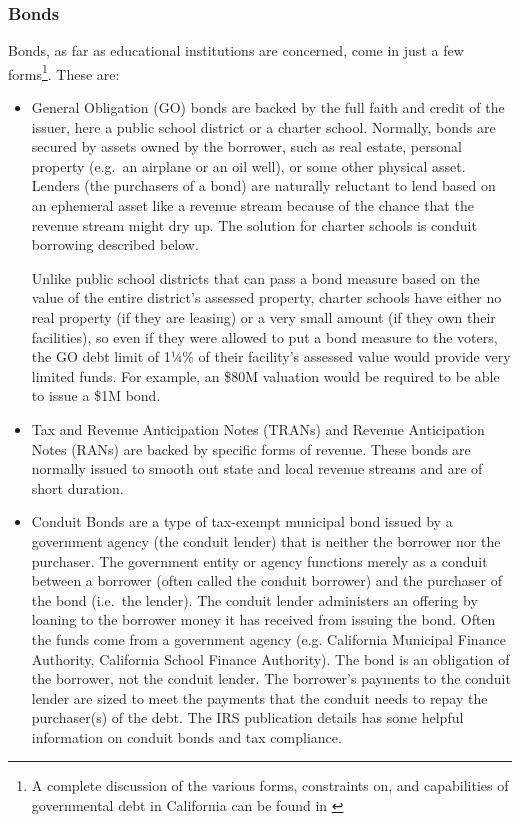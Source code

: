 \subsubsection{Bonds}%
\label{sec:bonds}\indent%

Bonds, as far as educational institutions are concerned, come in just a few forms\footnote{A complete discussion of the various forms, constraints on, and capabilities of governmental debt in California can be found in  \parencite{CDIAC2023}}. These are:

\begin{itemize}
  \item General Obligation (GO) bonds are backed by the full faith and credit of the issuer, here a public school district or a charter school. Normally, bonds are secured by assets owned by the borrower, such as real estate, personal property (e.g.\ an airplane or an oil well), or some other physical asset. Lenders (the purchasers of a bond) are naturally reluctant to lend based on an ephemeral asset like a revenue stream because of the chance that the revenue stream might dry up. The solution for charter schools is conduit borrowing described below.

  Unlike public school districts that can pass a bond measure based on the value of the entire district's assessed property, charter schools have either no real property (if they are leasing) or a very small amount (if they own their facilities), so even if they were allowed to put a bond measure to the voters, the GO debt limit of 1¼\% of their facility's assessed value would provide very limited funds. For example, an \$80M valuation would be required to be able to issue a \$1M bond. 

  \item Tax and Revenue Anticipation Notes (TRANs) and Revenue Anticipation Notes (RANs) are backed by specific forms of revenue. These bonds are normally issued to smooth out state and local revenue streams and are of short duration.
  
  \item Conduit Bonds are a type of tax-exempt municipal bond issued by  a government agency (the conduit lender) that is neither the borrower nor the purchaser. The government entity or agency functions merely as a conduit between a borrower (often called the conduit borrower) and the purchaser of the bond (i.e.\ the lender). The conduit lender administers an offering by loaning to the borrower money it has received from issuing the bond. Often the funds come from a government agency (e.g. California Municipal Finance Authority, California School Finance Authority). The bond is an obligation of the borrower, not the conduit lender. The borrower's payments to the conduit lender are sized to meet the payments that the conduit needs to repay the purchaser(s) of the debt. The IRS publication  details has some helpful information on conduit bonds and tax compliance.


\end{itemize}
